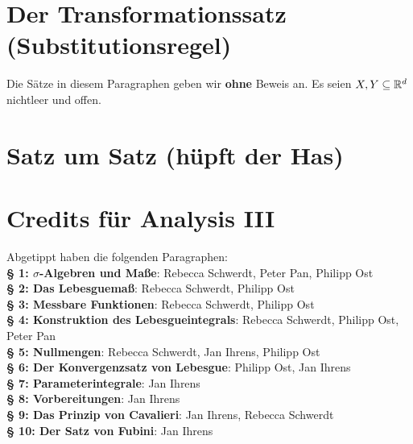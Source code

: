 \documentclass[a4paper,twoside,DIV15,BCOR12mm,chapterprefix=true,headings=onelinechapter]{scrbook}
\begin{document}
\chapter{Der Transformationssatz (Substitutionsregel)}

Die Sätze in diesem Paragraphen geben wir \textbf{ohne} Beweis an. Es seien
\(X,Y\subseteq\mathbb{R}^d\) nichtleer und offen. 

\appendix
\chapter{Satz um Satz (hüpft der Has)}

\renewcommand{\indexname}{Stichwortverzeichnis}
\printindex

\chapter{Credits für Analysis III} Abgetippt haben die folgenden Paragraphen:\\%
\textbf{§ 1: $\sigma$-Algebren und Maße}: Rebecca Schwerdt, Peter Pan, Philipp Ost\\
\textbf{§ 2: Das Lebesguemaß}: Rebecca Schwerdt, Philipp Ost\\
\textbf{§ 3: Messbare Funktionen}: Rebecca Schwerdt, Philipp Ost\\
\textbf{§ 4: Konstruktion des Lebesgueintegrals}: Rebecca Schwerdt, Philipp Ost, Peter Pan\\
\textbf{§ 5: Nullmengen}: Rebecca Schwerdt, Jan Ihrens, Philipp Ost\\
\textbf{§ 6: Der Konvergenzsatz von Lebesgue}: Philipp Ost, Jan Ihrens \\
\textbf{§ 7: Parameterintegrale}: Jan Ihrens \\
\textbf{§ 8: Vorbereitungen}: Jan Ihrens \\
\textbf{§ 9: Das Prinzip von Cavalieri}: Jan Ihrens, Rebecca Schwerdt\\
\textbf{§ 10: Der Satz von Fubini}: Jan Ihrens\\
\end{document}
